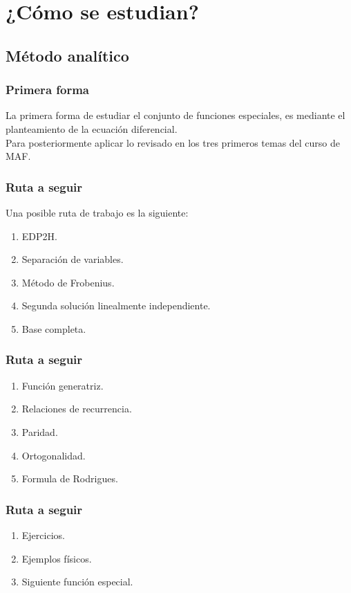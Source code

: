 \documentclass[12pt]{beamer}
\begin{document}
\section{¿Cómo se estudian?}
\subsection{Método analítico}

\begin{frame}
\frametitle{Primera forma}
La primera forma de estudiar el conjunto de funciones especiales, es mediante el planteamiento de la ecuación diferencial.
\\
\bigskip
\pause
Para posteriormente aplicar lo revisado en los tres primeros temas del curso de MAF.
\end{frame}
\begin{frame}
\frametitle{Ruta a seguir}
Una posible ruta de trabajo es la siguiente:
\begin{enumerate}[<+->]
\item EDP2H.
\item Separación de variables.
\item Método de Frobenius.
\item Segunda solución linealmente independiente.
\item Base completa.
\seti
\end{enumerate}
\end{frame}
\begin{frame}
\frametitle{Ruta a seguir}
\begin{enumerate}[<+->]
\conti
\item Función generatriz.
\item Relaciones de recurrencia.
\item Paridad.
\item Ortogonalidad.
\item Formula de Rodrigues.
\seti
\end{enumerate}
\end{frame}
\begin{frame}
\frametitle{Ruta a seguir}
\begin{enumerate}[<+->]
\conti
\item Ejercicios.
\item Ejemplos físicos.
\item Siguiente función especial.
\end{enumerate}
\end{frame}
\end{document}
